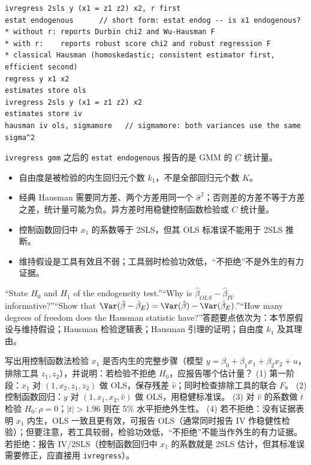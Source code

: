 \begin{lstlisting}
ivregress 2sls y (x1 = z1 z2) x2, r first
estat endogenous      // short form: estat endog -- is x1 endogenous?
* without r: reports Durbin chi2 and Wu-Hausman F
* with r:    reports robust score chi2 and robust regression F
* classical Hausman (homoskedastic; consistent estimator first, efficient second)
regress y x1 x2
estimates store ols
ivregress 2sls y (x1 = z1 z2) x2
estimates store iv
hausman iv ols, sigmamore   // sigmamore: both variances use the same sigma^2
\end{lstlisting}
\texttt{ivregress gmm} 之后的 \texttt{estat endogenous} 报告的是 GMM 的 $C$ 统计量。

\begin{note}[内生性检验的易错点]
\begin{itemize}
  \item 自由度是被检验的内生回归元个数 $k_1$，不是全部回归元个数 $K$。
  \item 经典 Hausman 需要同方差、两个方差用同一个 $\hat\sigma^2$；否则差的方差不等于方差之差，统计量可能为负。异方差时用稳健控制函数检验或 $C$ 统计量。
  \item 控制函数回归中 $x_1$ 的系数等于 2SLS，但其 OLS 标准误不能用于 2SLS 推断。
  \item 维持假设是工具有效且不弱；工具弱时检验功效低，“不拒绝”不是外生的有力证据。
\end{itemize}
\end{note}

\begin{keypt}[英文试卷可能的问法]
“State $H_0$ and $H_1$ of the endogeneity test.”“Why is $\hat\beta_{OLS}-\hat\beta_{IV}$ informative?”“Show that $\Var(\tilde\beta-\hat\beta_E)=\Var(\tilde\beta)-\Var(\hat\beta_E)$.”“How many degrees of freedom does the Hausman statistic have?”答题要点依次为：本节原假设与维持假设；Hausman 检验逻辑表；Hausman 引理的证明；自由度 $k_1$ 及其理由。
\end{keypt}

\begin{prac}[控制函数检验的步骤]\label{pr:U09-cfsteps}
写出用控制函数法检验 $x_1$ 是否内生的完整步骤（模型 $y=\beta_0+\beta_1x_1+\beta_2x_2+u$，排除工具 $z_1,z_2$），并说明：若检验不拒绝 $H_0$，应报告哪个估计量？
\answer
(1) 第一阶段：$x_1$ 对 $(1,x_2,z_1,z_2)$ 做 OLS，保存残差 $\hat v$；同时检查排除工具的联合 $F$。
(2) 控制函数回归：$y$ 对 $(1,x_1,x_2,\hat v)$ 做 OLS，用稳健标准误。
(3) 对 $\hat v$ 的系数做 $t$ 检验 $H_0:\rho=0$；$|t|>1.96$ 则在 5\% 水平拒绝外生性。
(4) 若不拒绝：没有证据表明 $x_1$ 内生，OLS 一致且更有效，可报告 OLS（通常同时报告 IV 作稳健性检验）；但要注意，若工具较弱，检验功效低，“不拒绝”不能当作外生的有力证据。若拒绝：报告 IV/2SLS（控制函数回归中 $x_1$ 的系数就是 2SLS 估计，但其标准误需要修正，应直接用 \texttt{ivregress}）。
\end{prac}

